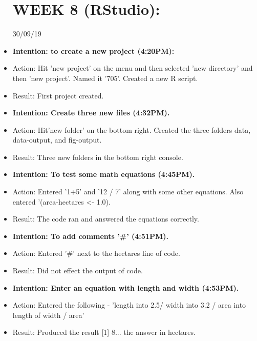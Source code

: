 \documentclass[a4paper,12pt]{article}
\begin{document}
\begin{itemize}
\begin{itemize}
\end{itemize}

\section{WEEK 8 (RStudio):}


30/09/19


\item \textbf{Intention: to create a new project (4:20PM):}


\item Action: Hit 'new project' on the menu and then selected 'new directory' and then 'new project'. Named it '705'. Created a new R script.

\item Result: First project created. 

\item \textbf{Intention: Create three new files (4:32PM). }


\item Action: Hit'new folder' on the bottom right. Created the three folders data, data-output, and fig-output.


\item Result: Three new folders in the bottom right console.


\item \textbf{Intention: To test some math equations (4:45PM).}


\item Action: Entered '1+5' and '12 / 7' along with some other equations. Also entered '(area-hectares <- 1.0). 


\item Result: The code ran and answered the equations correctly. 


\item \textbf{Intention: To add comments '#' (4:51PM).}


\item Action: Entered '#' next to the hectares line of code. 


\item Result: Did not effect the output of code.


\item \textbf{Intention: Enter an equation with length and width (4:53PM).}


\item Action: Entered the following - 'length into 2.5/ width into 3.2 / area into length of width / area'


\item Result: Produced the result [1] 8... the answer in hectares. 


\end{itemize}
\end{document}
